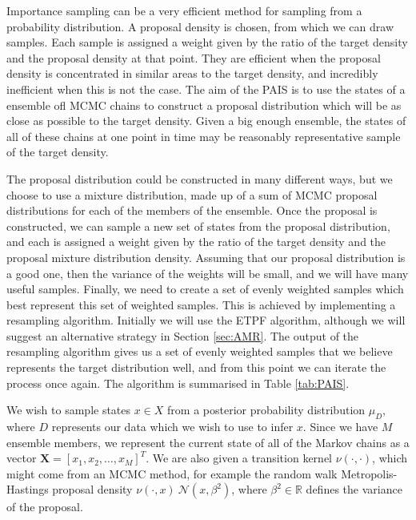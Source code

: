 \documentclass[final]{siamltex}
\newcommand{\X}{{\mathbf X}}
\begin{document}

Importance sampling can be a very efficient method for sampling from a
probability distribution. A proposal density is chosen, from which we
can draw samples. Each sample is assigned a weight given by the
ratio of the target density and the proposal density at that
point. They are efficient when the proposal density is concentrated in
similar areas to the target density, and incredibly inefficient when
this is not the case. The aim of the PAIS is to use the states of a
ensemble ofl MCMC chains to construct a proposal distribution which
will be as close as possible to the target density. Given a big enough
ensemble, the states of all of these chains at one point
in time may be reasonably representative sample of the target density.

The proposal distribution could be constructed in many different ways,
but we choose to use a mixture distribution, made up of a sum of MCMC
proposal distributions for each of the members of the ensemble. Once the proposal is
constructed, we can sample a new set of states from the proposal
distribution, and each is assigned a weight given by the ratio of the target
density and the proposal mixture distribution density. Assuming that
our proposal distribution is a good one, then the variance of the
weights will be small, and we will have many useful samples. Finally, we
need to create a set of evenly weighted samples which best represent
this set of weighted samples. This is achieved by implementing a
resampling algorithm. Initially we will use the
ETPF algorithm\cite{reich2013nonparametric}, although we will suggest an alternative strategy in
Section \ref{sec:AMR}. The output of the resampling algorithm gives us
a set of evenly weighted
samples that we believe represents the target distribution well, and
from this point we
can iterate the process once again. The algorithm is summarised in Table \ref{tab:PAIS}. 

We wish to sample states $x \in X$ from a posterior
probability distribution $\mu_D$, where $D$ represents our data which
we wish to use to infer $x$. Since we have $M$ ensemble members, we
represent the current state of all of the Markov chains as a vector
$\X = [x_1,x_2,\ldots,x_M]^T$. We are also given a transition kernel
$\nu(\cdot,\cdot)$, which might come from an MCMC method, for example
the random walk Metropolis-Hastings proposal density $\nu(\cdot,x) ~
\mathcal{N}(x,\beta^2)$, where $\beta^2\in \mathbb{R}$ defines the
variance of the proposal.
\end{document}
